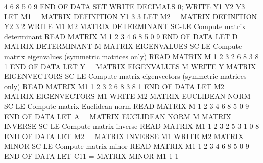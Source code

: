                                   4 6 8
                                  5 0 9
                                  END OF DATA
                                  SET WRITE DECIMALS 0; WRITE Y1 Y2 Y3
                                  LET M1 = MATRIX DEFINITION Y1 3 3
                                  LET M2 = MATRIX DEFINITION Y2 3 2
                                  WRITE M1 M2
MATRIX DETERMINANT          SC-LE Compute matrix determinant
                                  READ MATRIX M
                                  1 2 3
                                  4 6 8
                                  5 0 9
                                  END OF DATA
                                  LET D = MATRIX DETERMINANT M
MATRIX EIGENVALUES          SC-LE Compute matrix eigenvalues
                                  (symmetric matrices only)
                                  READ MATRIX M
                                  1 2 3
                                  2 6 8
                                  3 8 1
                                  END OF DATA
                                  LET Y = MATRIX EIGENVALUES M
                                  WRITE Y
MATRIX EIGENVECTORS         SC-LE Compute matrix eigenvectors
                                  (symmetric matrices only)
                                  READ MATRIX M1
                                  1 2 3
                                  2 6 8
                                  3 8 1
                                  END OF DATA
                                  LET M2 = MATRIX EIGENVECTORS M1
                                  WRITE M2
MATRIX EUCLIDEAN NORM       SC-LE Compute matrix Euclidean norm
                                  READ MATRIX M
                                  1 2 3
                                  4 6 8
                                  5 0 9
                                  END OF DATA
                                  LET A = MATRIX EUCLIDEAN NORM M
MATRIX INVERSE              SC-LE Compute matrix inverse
                                  READ MATRIX M1
                                  1 2 3
                                  2 5 3
                                  1 0 8
                                  END OF DATA
                                  LET M2 = MATRIX INVERSE M1
                                  WRITE M2
MATRIX MINOR                SC-LE Compute matrix minor
                                  READ MATRIX M1
                                  1 2 3
                                  4 6 8
                                  5 0 9
                                  END OF DATA
                                  LET C11 = MATRIX MINOR M1 1 1
